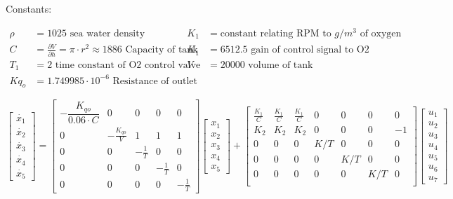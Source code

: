 \documentclass{article}
\begin{document}
Constants:

\begin{align*}
    \rho &= 1025 \text{ sea water density} & K_1&= \text{constant relating RPM to $g/m^3$ of oxygen}\\
    C&=\frac{\partial V}{\partial h} = \pi \cdot r^2 \approx 1886 \text{ Capacity of tank} & K_1 &= 6512.5 \text{ gain of control signal to O2 massflow}\\
    T_1&= 2 \text{ time constant of O2 control valve} & V&=20000 \text{ volume of tank}\\
    Kq_o &= 1.749985\cdot 10^{-6}\text{ Resistance of outlet}
\end{align*}

\begin{equation}
    \begin{bmatrix}
    \dot{x_1}\\    
    \dot{x_2}\\
    \dot{x_3}\\
    \dot{x_4}\\
    \dot{x_5}
    \end{bmatrix}
    =
    \begin{bmatrix}
        -\dfrac{K_{qo}}{0.06\cdot C} & 0 & 0 & 0 &0\\ 
        0 & -\frac{K_{qo}}{V} & 1 & 1 & 1\\
        0 & 0 & -\frac{1}{T} & 0 & 0\\
        0 & 0 & 0 &  -\frac{1}{T} & 0\\
        0 & 0 & 0 & 0 &  -\frac{1}{T}
    \end{bmatrix}
    \begin{bmatrix}
        x_1\\    
        x_2\\
        x_3\\
        x_4\\
        x_5
    \end{bmatrix}
    +
    \begin{bmatrix}
        \frac{K_1}{C} & \frac{K_1}{C} & \frac{K_1}{C} & 0 & 0  & 0 & 0  \\    
         K_2 &  K_2 &  K_2 &0& 0&0&-1\\
         0& 0& 0& K/T& 0& 0& 0\\
         0& 0& 0& 0&K/T& 0& 0\\
         0& 0& 0& 0& 0& K/T& 0\\

    \end{bmatrix}
    \begin{bmatrix}
        u_1\\    
        u_2\\
        u_3\\
        u_4\\
        u_5\\
        u_6\\
        u_7
    \end{bmatrix}
\end{equation}
\end{document}
